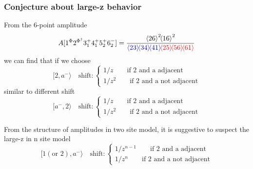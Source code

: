 \documentclass{beamer}
\newcommand{\avg}[1]{\langle #1 \rangle}
\newcommand{\mdavg}[2]{\langle #1 \rangle\!\langle #2 \rangle}
\newcommand{\asqu}[1]{{\langle#1\rangle}^2}
\begin{document}
\begin{frame}
    \frametitle{Conjecture about large-z behavior}
    From the 6-point amplitude 
    \begin{equation*}
        A[1^\Phi2^{\Phi^\dagger}3_1^+4_1^+5_2^+6_2^-]=\frac{\asqu{26}\!\asqu{16}}{\textcolor{blue}{\mdavg{23}{34}\!\avg{41}}\!\textcolor{red}{\mdavg{25}{56}\!\avg{61}}}
    \end{equation*}
    we can find that if we choose
    \begin{equation*}
        [2,a^-\rangle\quad \text{shift}:\left\{ 
\begin{array}{l}
1/z\qquad \text{if 2 and a adjacent}\\
1/z^2\qquad \text{if 2 and a not adjacent}
\end{array}
\right.
    \end{equation*}
    similar to different shift
    \begin{equation*}
        [a^-,2\rangle\quad\text{shift}:\left\{
            \begin{array}{l}
                1/z\qquad \text{if 2 and a adjacent}\\
                1/z^2\qquad \text{if 2 and a not adjacent}
            \end{array}
        \right.
    \end{equation*}

    From the structure of amplitudes in two site model, it is suggestive to suspect the large-z in n site model
\begin{equation*}
        [1(\text{or 2}),a^-\rangle\quad\text{shift}:\left\{
            \begin{array}{l}
                1/z^{n-1}\qquad \text{if 2 and a adjacent}\\
                1/z^n\qquad \text{if 2 and a not adjacent}
            \end{array}
        \right.
    \end{equation*}
\end{frame}
\end{document}

